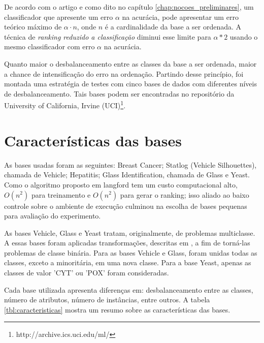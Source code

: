 De acordo com o artigo \cite{langford08} e como dito no capítulo \ref{chap:nocoes_preliminares}, um classificador que apresente um erro $\alpha$ na acurácia, pode apresentar um erro teórico máximo de $\alpha \cdot n$, onde $n$ é a cardinalidade da base a ser ordenada. A técnica de \emph{ranking reduzido a classificação} diminui esse limite para $\alpha * 2$ usando o mesmo classificador com erro $\alpha$ na acurácia.

Quanto maior o desbalanceamento entre as classes da base a ser ordenada, maior a chance de intensificação do erro na ordenação. Partindo desse princípio, foi montada uma estratégia de testes com cinco bases de dados com diferentes níveis de desbalanceamento. Tais bases podem ser encontradas no repositório da University of California, Irvine (UCI)\footnote{http://archive.ics.uci.edu/ml/}.

\section{Características das bases}

As bases usadas foram as seguintes: Breast Cancer; Statlog (Vehicle Silhouettes), chamada de Vehicle; Hepatitis; Glass Identification, chamada de Glass e Yeast. Como o algoritmo proposto em {{langford}} tem um custo computacional alto, $O(n^2)$ para treinamento e $O(n^2)$ para gerar o ranking; isso aliado ao baixo controle sobre o ambiente de execução culminou na escolha de bases pequenas para avaliação do experimento.

As bases Vehicle, Glass e Yeast tratam, originalmente, de problemas multiclasse. A essas bases foram aplicadas transformações, descritas em \cite{guo04}, a fim de torná-las problemas de classe binária. Para as bases Vehicle e Glass, foram unidas todas as classes, exceto a minoritária, em uma nova classe. Para a base Yeast, apenas as classes de valor 'CYT' ou 'POX' foram consideradas.

Cada base utilizada apresenta diferenças em: desbalanceamento entre as classes, número de atributos, número de instâncias, entre outros. A tabela \ref{tbl:caracteristicas} mostra um resumo sobre as características das bases.

